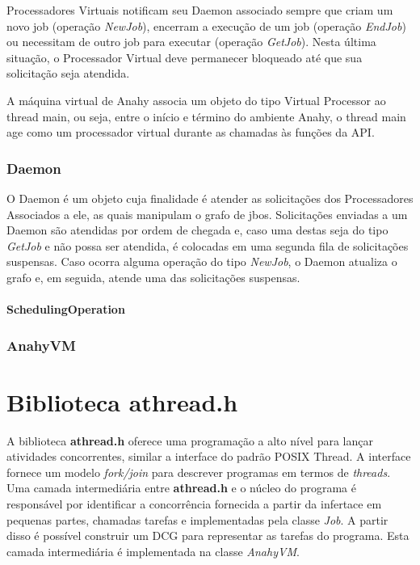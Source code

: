 \documentclass[12pt]{article}
\begin{document}
Processadores Virtuais notificam seu Daemon associado sempre que criam um novo job (operação \textit{NewJob}), encerram a execução de um job (operação \textit{EndJob}) ou necessitam de outro job para executar (operação \textit{GetJob}). Nesta última situação, o Processador Virtual deve permanecer bloqueado até que sua solicitação seja atendida.

A máquina virtual de Anahy associa um objeto do tipo Virtual Processor ao thread main, ou seja, entre o início e término do ambiente Anahy, o thread main age como um processador virtual durante as chamadas às funções da API.

\subsubsection{Daemon}

O Daemon é um objeto cuja finalidade é atender as solicitações dos Processadores Associados a ele, as quais manipulam o grafo de jbos. Solicitações enviadas a um Daemon são atendidas por ordem de chegada e, caso uma destas seja do tipo \textit{GetJob} e não possa ser atendida, é colocadas em uma segunda fila de solicitações suspensas. Caso ocorra alguma operação do tipo \textit{NewJob}, o Daemon atualiza o grafo e, em seguida, atende uma das solicitações suspensas.

\paragraph{SchedulingOperation}


\subsubsection{AnahyVM}



\section{Biblioteca athread.h} %
\label{sec:athread}

A biblioteca \textbf{athread.h} oferece uma programação a alto nível para lançar atividades concorrentes, similar a interface do 
padrão POSIX Thread. A interface fornece um modelo \emph{fork/join} para descrever programas em termos de \emph{threads}. Uma 
camada intermediária entre \textbf{athread.h} e o núcleo do programa é responsável por identificar a concorrência fornecida 
a partir da infertace em pequenas partes, chamadas tarefas e implementadas pela classe \emph{Job}. A partir disso é possível
construir um DCG para representar as tarefas do programa. Esta camada intermediária é implementada na classe \emph{AnahyVM}.
\end{document}
